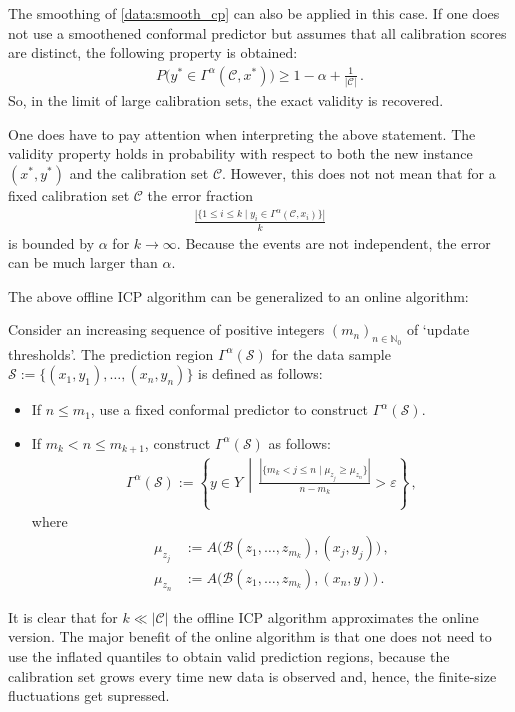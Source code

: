 \begin{property}[Validity]
        The smoothing of \cref{data:smooth_cp} can also be applied in this case. If one does not use a smoothened conformal predictor but assumes that all calibration scores are distinct, the following property is obtained:
        \begin{gather}
            P\bigl(y^*\in\Gamma^\alpha(\mathcal{C},x^*)\bigr)\geq 1 - \alpha + \frac{1}{|\mathcal{C}|}\,.
        \end{gather}
        So, in the limit of large calibration sets, the exact validity is recovered.
    \end{property}
    \begin{remark}
        One does have to pay attention when interpreting the above statement. The validity property holds in probability with respect to both the new instance $(x^*,y^*)$ and the calibration set $\mathcal{C}$. However, this does not not mean that for a fixed calibration set $\mathcal{C}$ the error fraction
        \begin{gather}
            \frac{|\{1\leq i\leq k\mid y_i\in\Gamma^\alpha(\mathcal{C},x_i)\}|}{k}
        \end{gather}
        is bounded by $\alpha$ for $k\longrightarrow\infty$. Because the events are not independent, the error can be much larger than $\alpha$.
    \end{remark}

    The above offline ICP algorithm can be generalized to an online algorithm:
    \begin{construct}
        Consider an increasing sequence of positive integers $(m_n)_{n\in\mathbb{N}_0}$ of `update thresholds'. The prediction region $\Gamma^\alpha(\mathcal{S})$ for the data sample $\mathcal{S}:=\{(x_1,y_1),\ldots,(x_n,y_n)\}$ is defined as follows:
        \begin{itemize}
            \item If $n\leq m_1$, use a fixed conformal predictor to construct $\Gamma^\alpha(\mathcal{S})$.
            \item If $m_k<n\leq m_{k+1}$, construct $\Gamma^\alpha(\mathcal{S})$ as follows:
            \begin{gather}
                \Gamma^\alpha(\mathcal{S}) := \left\{y\in Y\,\middle\vert\,\frac{|\{m_k<j\leq n\mid\mu_{z_j}\geq\mu_{z_n}\}|}{n-m_k}>\varepsilon\right\}\,,
            \end{gather}
            where
            \begin{align*}
                \mu_{z_j} &:= A\bigl(\mathcal{B}(z_1,\ldots,z_{m_k}),(x_j,y_j)\bigr)\,,\\
                \mu_{z_n} &:= A\bigl(\mathcal{B}(z_1,\ldots,z_{m_k}),(x_n,y)\bigr)\,.
            \end{align*}
        \end{itemize}
        It is clear that for $k\ll|\mathcal{C}|$ the offline ICP algorithm approximates the online version. The major benefit of the online algorithm is that one does not need to use the inflated quantiles to obtain valid prediction regions, because the calibration set grows every time new data is observed and, hence, the finite-size fluctuations get supressed.
    \end{construct}

